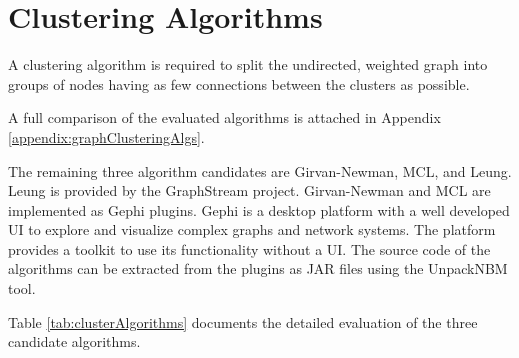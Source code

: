 \section{Clustering Algorithms}
\label{sec:algorithms}

A clustering algorithm is required to split the undirected, weighted graph into groups of nodes having as few connections between the clusters as possible. 

A full comparison of the evaluated algorithms is attached in Appendix \ref{appendix:graphClusteringAlgs}.

The remaining three algorithm candidates are Girvan-Newman, MCL, and Leung. Leung is provided by the GraphStream project. Girvan-Newman and MCL are implemented as Gephi plugins. Gephi is a desktop platform with a well developed \gls{UI} to explore and visualize complex graphs and network systems. The platform provides a toolkit to use its functionality without a \gls{UI}.  The source code of the algorithms can be extracted from the plugins as \gls{JAR} files using the UnpackNBM tool\cite{unpackNBM}.

Table \ref{tab:clusterAlgorithms} documents the detailed evaluation of the three candidate algorithms. 

